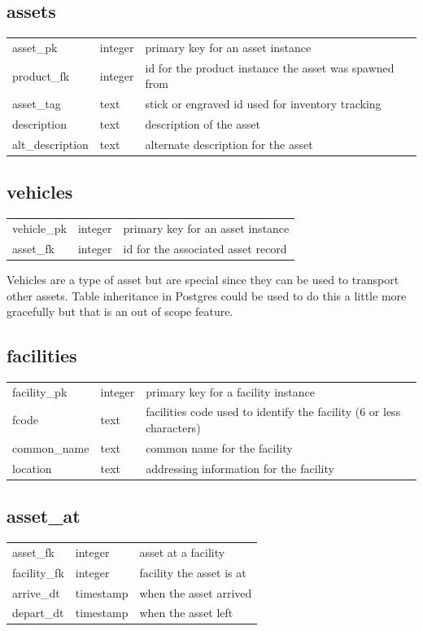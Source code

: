 \subsection*{assets}
\begin{tabular}{l|l|l}
\hline
asset\_pk & integer & primary key for an asset instance \\
product\_fk & integer & id for the product instance the asset was spawned from \\
asset\_tag & text & stick or engraved id used for inventory tracking \\
description & text & description of the asset \\
alt\_description & text & alternate description for the asset \\
\hline
\end{tabular}

\subsection*{vehicles}
\begin{tabular}{l|l|l}
\hline
vehicle\_pk & integer & primary key for an asset instance \\
asset\_fk & integer & id for the associated asset record \\
\hline
\end{tabular}

Vehicles are a type of asset but are special since they can be used to transport other assets. Table inheritance in Postgres could be used to do this a little more gracefully but that is an out of scope feature.

\subsection*{facilities}
\begin{tabular}{l|l|l}
\hline
facility\_pk & integer & primary key for a facility instance \\
fcode & text & facilities code used to identify the facility (6 or less characters) \\
common\_name & text & common name for the facility \\
location & text & addressing information for the facility \\
\hline
\end{tabular}

\subsection*{asset\_at}
\begin{tabular}{l|l|l}
\hline
asset\_fk & integer & asset at a facility \\
facility\_fk & integer & facility the asset is at \\
arrive\_dt & timestamp & when the asset arrived \\
depart\_dt & timestamp & when the asset left \\
\hline
\end{tabular}

